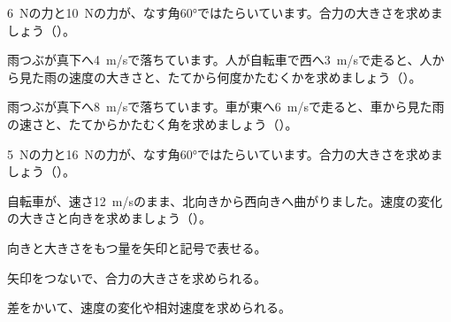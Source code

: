 \bkproblem \qty{6}{N}の力と\qty{10}{N}の力が、なす角60°ではたらいています。合力の大きさを求めましょう（）。

\bkproblem 雨つぶが真下へ\qty{4}{m/s}で落ちています。人が自転車で西へ\qty{3}{m/s}で走ると、人から見た雨の速度の大きさと、たてから何度かたむくかを求めましょう（）。

\par\newpage
\bkproblem 雨つぶが真下へ\qty{8}{m/s}で落ちています。車が東へ\qty{6}{m/s}で走ると、車から見た雨の速さと、たてからかたむく角を求めましょう（）。

\bkproblem \qty{5}{N}の力と\qty{16}{N}の力が、なす角60°ではたらいています。合力の大きさを求めましょう（）。

\bkproblem 自転車が、速さ\qty{12}{m/s}のまま、北向きから西向きへ曲がりました。速度の変化の大きさと向きを求めましょう（）。

\begin{furikaeri}
\begin{checklist}
\item 向きと大きさをもつ量を矢印と記号で表せる。
\item 矢印をつないで、合力の大きさを求められる。
\item 差をかいて、速度の変化や相対速度を求められる。
\end{checklist}
\end{furikaeri}

